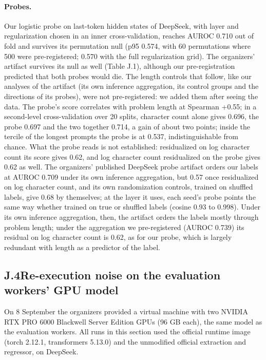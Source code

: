 \paragraph{Probes.}
Our logistic probe on last-token hidden states of DeepSeek, with layer and regularization chosen in an inner cross-validation, reaches AUROC 0.710 out of fold and survives its permutation null (p95 0.574, with 60 permutations where 500 were pre-registered; 0.570 with the full regularization grid). The organizers' artifact survives its null as well (Table J.1), although our pre-registration predicted that both probes would die. The length controls that follow, like our analyses of the artifact (its own inference aggregation, its control groups and the directions of its probes), were not pre-registered: we added them after seeing the data. The probe's score correlates with problem length at Spearman +0.55; in a second-level cross-validation over 20 splits, character count alone gives 0.696, the probe 0.697 and the two together 0.714, a gain of about two points; inside the tercile of the longest prompts the probe is at 0.537, indistinguishable from chance. What the probe reads is not established: residualized on log character count its score gives 0.62, and log character count residualized on the probe gives 0.62 as well. The organizers' published DeepSeek probe artifact orders our labels at AUROC 0.709 under its own inference aggregation, but 0.57 once residualized on log character count, and its own randomization controls, trained on shuffled labels, give 0.68 by themselves; at the layer it uses, each seed's probe points the same way whether trained on true or shuffled labels (cosine 0.93 to 0.998). Under its own inference aggregation, then, the artifact orders the labels mostly through problem length; under the aggregation we pre-registered (AUROC 0.739) its residual on log character count is 0.62, as for our probe, which is largely redundant with length as a predictor of the label.

\subsection*{J.4\quad Re-execution noise on the evaluation workers' GPU model}

On 8 September the organizers provided a virtual machine with two NVIDIA RTX PRO 6000 Blackwell Server Edition GPUs (96 GB each), the same model as the evaluation workers. All runs in this section used the official runtime image (torch 2.12.1, transformers 5.13.0) and the unmodified official extraction and regressor, on DeepSeek.


